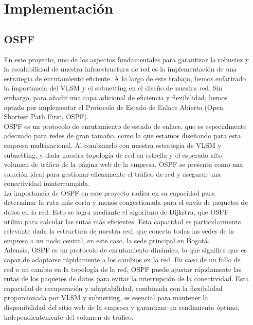 \section{Implementación}

\subsection{OSPF}

En este proyecto, uno de los aspectos fundamentales para garantizar la robustez
y la escalabilidad de nuestra infraestructura de red es la implementación de
una estrategia de enrutamiento eficiente. A lo largo de este trabajo, hemos
enfatizado la importancia del VLSM y el subnetting en el diseño de nuestra red.
Sin embargo, para añadir una capa adicional de eficiencia y flexibilidad, hemos
optado por implementar el Protocolo de Estado de Enlace Abierto
(Open Shortest Path First, OSPF).
\\

OSPF es un protocolo de enrutamiento de estado de enlace, que es especialmente
adecuado para redes de gran tamaño, como la que estamos diseñando para esta
empresa multinacional. Al combinarlo con nuestra estrategia de VLSM y
subnetting, y dada nuestra topología de red en estrella y el esperado alto
volumen de tráfico de la página web de la empresa, OSPF se presenta como una
solución ideal para gestionar eficazmente el tráfico de red y asegurar una
conectividad ininterrumpida.
\\

La importancia de OSPF en este proyecto radica en su capacidad para determinar
la ruta más corta y menos congestionada para el envío de paquetes de datos en
la red. Esto se logra mediante el algoritmo de Dijkstra, que OSPF utiliza para
calcular las rutas más eficientes. Esta capacidad es particularmente relevante
dada la estructura de nuestra red, que conecta todas las sedes de la empresa a
un nodo central, en este caso, la sede principal en Bogotá.
\\

Además, OSPF es un protocolo de enrutamiento dinámico, lo que significa que es
capaz de adaptarse rápidamente a los cambios en la red. En caso de un fallo de
red o un cambio en la topología de la red, OSPF puede ajustar rápidamente las
rutas de los paquetes de datos para evitar la interrupción de la conectividad.
Esta capacidad de recuperación y adaptabilidad, combinada con la flexibilidad
proporcionada por VLSM y subnetting, es esencial para mantener la disponibilidad
del sitio web de la empresa y garantizar un rendimiento óptimo,
independientemente del volumen de tráfico.
\\

